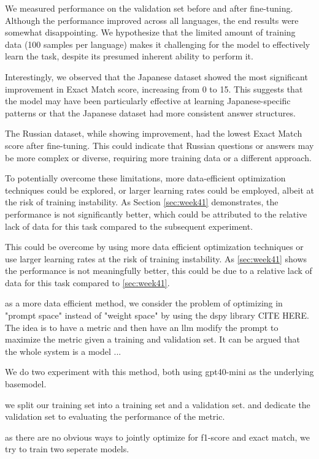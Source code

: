 \documentclass[11pt]{article}
\begin{document}
We measured performance on the validation set before and after fine-tuning. 
Although the performance improved across all languages, the end results were somewhat disappointing.
We hypothesize that the limited amount of training data (100 samples per language) makes it challenging for the model to effectively learn the task, despite its presumed inherent ability to perform it.

Interestingly, we observed that the Japanese dataset showed the most significant improvement in Exact Match score, increasing from 0 to 15. This suggests that the model may have been particularly effective at learning Japanese-specific patterns or that the Japanese dataset had more consistent answer structures.

The Russian dataset, while showing improvement, had the lowest Exact Match score after fine-tuning. This could indicate that Russian questions or answers may be more complex or diverse, requiring more training data or a different approach.

To potentially overcome these limitations, more data-efficient optimization techniques could be explored, or larger learning rates could be employed, albeit at the risk of training instability.
As Section \ref{sec:week41} demonstrates, the performance is not significantly better, which could be attributed to the relative lack of data for this task compared to the subsequent experiment.

This could be overcome by using more data efficient optimization techniques or use larger learning rates at the risk of training instability.
As \ref{sec:week41} shows the performance is not meaningfully better, this could be due to a relative lack of data for this task compared to \ref{sec:week41}.

as a more data efficient method, we consider the problem of optimizing in "prompt space" instead of "weight space" by using the dspy library CITE HERE. 
The idea is to have a metric and then have an llm modify the prompt to maximize the metric given a training and validation set. 
It can be argued that the whole system is a model ... 

We do two experiment with this method, both using gpt40-mini as the underlying basemodel.

we split our training set into a training set and a validation set. and dedicate the validation set to evaluating the performance of the metric.

as there are no obvious ways to jointly optimize for f1-score and exact match, we try to train two seperate models.
\end{document}
